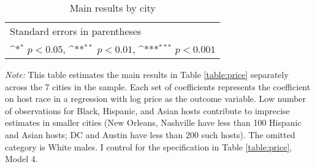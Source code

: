 \begin{table}[htbp]\centering
	\def\sym#1{\ifmmode^{#1}\else\(^{#1}\)\fi}
	\caption{Main results by city}
	\begin{tabular}{l*{7}{c}}
		\hline\hline
		
		\hline\hline
		\multicolumn{8}{l}{\footnotesize Standard errors in parentheses}\\
		\multicolumn{8}{l}{\footnotesize \sym{*} \(p<0.05\), \sym{**} \(p<0.01\), \sym{***} \(p<0.001\)}\\
	\end{tabular}
	\label{table:robustcity}
	\begin{tablenotes}
		
		\item {\it Note:} This table estimates the main results in Table \ref{table:price} separately across the 7 cities in the sample. Each set of coefficients represents the coefficient on host race in a regression with log price as the outcome variable. Low number of observations for Black, Hispanic, and Asian hosts contribute to imprecise estimates in smaller cities (New Orleans, Nashville have less than 100 Hispanic and Asian hosts; DC and Austin have less than 200 such hosts). The omitted category is White males. I control for the specification in Table \ref{table:price}, Model 4.
		
	\end{tablenotes}
\end{table}


